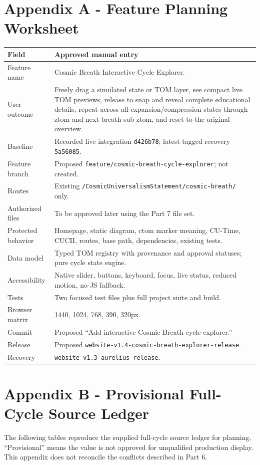 \documentclass[11pt,letterpaper]{article}
\newcommand{\filepath}[1]{\nolinkurl{#1}}
\newcommand{\branchname}[1]{\texttt{#1}}
\newcommand{\release}[1]{\texttt{#1}}
\begin{document}
\section{Appendix A - Feature Planning Worksheet}
\begin{longtable}{L{1.75in}L{4.65in}}
\toprule
\textbf{Field} & \textbf{Approved manual entry} \\
\midrule
Feature name & Cosmic Breath Interactive Cycle Explorer. \\
User outcome & Freely drag a simulated state or TOM layer, see compact live TOM previews, release to snap and reveal complete educational details, repeat across all expansion/compression states through ztom and next-breath sub-ztom, and reset to the original overview. \\
Baseline & Recorded live integration \release{d426b78}; latest tagged recovery \release{5a56085}. \\
Feature branch & Proposed \branchname{feature/cosmic-breath-cycle-explorer}; not created. \\
Routes & Existing \filepath{/CosmicUniversalismStatement/cosmic-breath/} only. \\
Authorized files & To be approved later using the Part 7 file set. \\
Protected behavior & Homepage, static diagram, ctom marker meaning, CU-Time, CUCII, routes, base path, dependencies, existing tests. \\
Data model & Typed TOM registry with provenance and approval statuses; pure cycle state engine. \\
Accessibility & Native slider, buttons, keyboard, focus, live status, reduced motion, no-JS fallback. \\
Tests & Two focused test files plus full project suite and build. \\
Browser matrix & 1440, 1024, 768, 390, 320px. \\
Commit & Proposed ``Add interactive Cosmic Breath cycle explorer.'' \\
Release & Proposed \release{website-v1.4-cosmic-breath-explorer-release}. \\
Recovery & \release{website-v1.3-aurelius-release}. \\
\bottomrule
\end{longtable}

\section{Appendix B - Provisional Full-Cycle Source Ledger}
\begin{warningbox}
The following tables reproduce the supplied full-cycle source ledger for planning. ``Provisional'' means the value is not approved for unqualified production display. This appendix does not reconcile the conflicts described in Part 6.
\end{warningbox}
\end{document}
